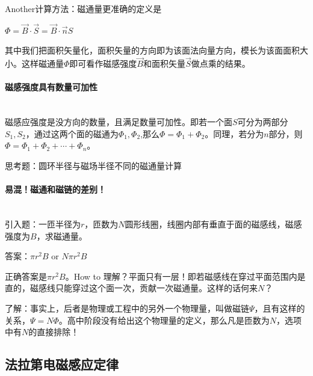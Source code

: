 \documentclass{ctexbook}
\begin{document}
	\hspace*{\fill}
	
	Another计算方法：磁通量更准确的定义是
	
	\centerline{$\varPhi=\vec{B} \cdot \vec{S}=\vec{B} \cdot \vec{n} S$}
	
	其中我们把面积矢量化，面积矢量的方向即为该面法向量方向，模长为该面面积大小。这样磁通量$\varPhi$即可看作磁感强度$\vec{B}$和面积矢量$\vec{S}$做点乘的结果。
	
	\paragraph{磁感强度具有数量可加性}~{}
	\\
	\indent
	磁感应强度是没方向的数量，且满足数量可加性。即若一个面$S$可分为两部分$S_1,S_2$，通过这两个面的磁通为$\varPhi_1,\varPhi_2$,那么$\varPhi=\varPhi_1+\varPhi_2$。同理，若分为$n$部分，则$\varPhi=\varPhi_1+\varPhi_2+\cdots+\varPhi_n$。
	
	思考题：圆环半径与磁场半径不同的磁通量计算
	
	\hspace*{\fill}
	
	\hspace*{\fill}
	
	\hspace*{\fill}
	
	\hspace*{\fill}
	
	\hspace*{\fill}
	
	\paragraph{易混！磁通和磁链的差别！}~{}
	\\
	\indent
	引入题：一匝半径为$r$，匝数为$N$圆形线圈，线圈内部有垂直于面的磁感线，磁感强度为$B$，求磁通量。
	
	答案：$\pi r^2 B$ or $N \pi r^2 B$
	
	正确答案是$\pi r^2 B$。How to 理解？平面只有一层！即若磁感线在穿过平面范围内是直的，磁感线只能穿过这个面一次，贡献一次磁通量。这样的话何来$N$？
	
	了解：事实上，后者是物理或工程中的另外一个物理量，叫做磁链$\varPsi$，且有这样的关系，$\varPsi=N\varPhi$。高中阶段没有给出这个物理量的定义，那么凡是匝数为$N$，选项中有$N$的直接排除！
	\subsection{法拉第电磁感应定律}
	
\end{document}
